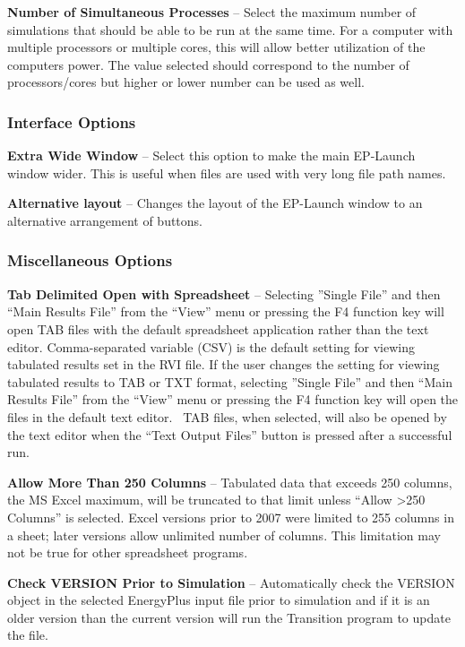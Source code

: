 \textbf{Number of Simultaneous Processes} -- Select the maximum number of simulations that should be able to be run at the same time. For a computer with multiple processors or multiple cores, this will allow better utilization of the computers power. The value selected should correspond to the number of processors/cores but higher or lower number can be used as well.

\subsubsection{Interface Options}\label{interface-options}

\textbf{Extra Wide Window} -- Select this option to make the main EP-Launch window wider. This is useful when files are used with very long file path names.

\textbf{Alternative layout} -- Changes the layout of the EP-Launch window to an alternative arrangement of buttons.

\subsubsection{Miscellaneous Options}\label{miscellaneous-options}

\textbf{Tab Delimited Open with Spreadsheet} -- Selecting ''Single File'' and then ``Main Results File'' from the ``View'' menu or pressing the F4 function key will open TAB files with the default spreadsheet application rather than the text editor. Comma-separated variable (CSV) is the default setting for viewing tabulated results set in the RVI file. If the user changes the setting for viewing tabulated results to TAB or TXT format, selecting ''Single File'' and then ``Main Results File'' from the ``View'' menu or pressing the F4 function key will open the files in the default text editor.~ TAB files, when selected, will also be opened by the text editor when the ``Text Output Files'' button is pressed after a successful run.

\textbf{Allow More Than 250 Columns} -- Tabulated data that exceeds 250 columns, the MS Excel maximum, will be truncated to that limit unless ``Allow \textgreater{}250 Columns'' is selected. Excel versions prior to 2007 were limited to 255 columns in a sheet; later versions allow unlimited number of columns. This limitation may not be true for other spreadsheet programs.

\textbf{Check VERSION Prior to Simulation} -- Automatically check the VERSION object in the selected EnergyPlus input file prior to simulation and if it is an older version than the current version will run the Transition program to update the file.

